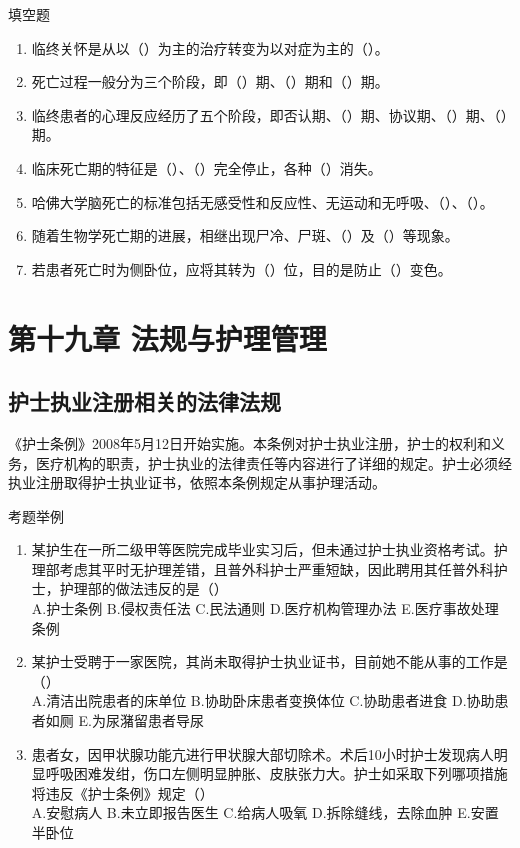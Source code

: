 \documentclass[11pt, a4paper]{ctexart}
\begin{document}
\begin{tipsbox}{填空题}
	\begin{enumerate}
		\item 临终关怀是从以（\qquad）为主的治疗转变为以对症为主的（\qquad）。
		\item 死亡过程一般分为三个阶段，即（\qquad）期、（\qquad）期和（\qquad）期。
		\item 临终患者的心理反应经历了五个阶段，即否认期、（\qquad）期、协议期、（\qquad）期、（\qquad）期。
		\item 临床死亡期的特征是（\qquad）、（\qquad）完全停止，各种（\qquad）消失。
		\item 哈佛大学脑死亡的标准包括无感受性和反应性、无运动和无呼吸、（\qquad）、（\qquad）。
		\item 随着生物学死亡期的进展，相继出现尸冷、尸斑、（\qquad）及（\qquad）等现象。
		\item 若患者死亡时为侧卧位，应将其转为（\qquad）位，目的是防止（\qquad）变色。
	\end{enumerate}
\end{tipsbox}

\section{第十九章 法规与护理管理}
\subsection{护士执业注册相关的法律法规}
《护士条例》2008年5月12日开始实施。本条例对护士执业注册，护士的权利和义务，医疗机构的职责，护士执业的法律责任等内容进行了详细的规定。护士必须经执业注册取得护士执业证书，依照本条例规定从事护理活动。

\begin{examplebox}{考题举例}
	\begin{enumerate}
		\item 某护生在一所二级甲等医院完成毕业实习后，但未通过护士执业资格考试。护理部考虑其平时无护理差错，且普外科护士严重短缺，因此聘用其任普外科护士，护理部的做法违反的是（\qquad）\\
		      A.护士条例 \quad B.侵权责任法 \quad C.民法通则 \quad D.医疗机构管理办法 \quad E.医疗事故处理条例
		\item 某护士受聘于一家医院，其尚未取得护士执业证书，目前她不能从事的工作是（\qquad）\\
		      A.清洁出院患者的床单位 \quad B.协助卧床患者变换体位 \quad C.协助患者进食 \quad D.协助患者如厕 \quad E.为尿潴留患者导尿
		\item 患者女，因甲状腺功能亢进行甲状腺大部切除术。术后10小时护士发现病人明显呼吸困难发绀，伤口左侧明显肿胀、皮肤张力大。护士如采取下列哪项措施将违反《护士条例》规定（\qquad）\\
		      A.安慰病人 \quad B.未立即报告医生 \quad C.给病人吸氧 \quad D.拆除缝线，去除血肿 \quad E.安置半卧位
	\end{enumerate}
\end{examplebox}
\end{document}
